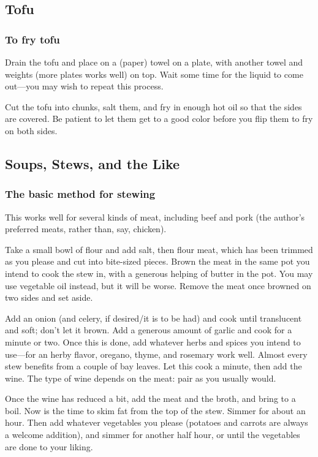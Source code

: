 \documentclass[10pt]{article}
\begin{document}
\subsection*{Tofu}

\subsubsection*{To fry tofu}

Drain the tofu and place on a (paper) towel on a plate, with another towel and weights (more plates works well) on top.
Wait some time for the liquid to come out---you may wish to repeat this process.

Cut the tofu into chunks, salt them, and fry in enough hot oil so that the sides are covered.
Be patient to let them get to a good color before you flip them to fry on both sides.

\subsection*{Soups, Stews, and the Like}

\subsubsection*{The basic method for stewing}

This works well for several kinds of meat, including beef and pork (the author's preferred meats, rather than, say, chicken).

Take a small bowl of flour and add salt, then flour meat, which has been trimmed as you please and cut into bite-sized pieces.
Brown the meat in the same pot you intend to cook the stew in, with a generous helping of butter in the pot.
You may use vegetable oil instead, but it will be worse.
Remove the meat once browned on two sides and set aside.

Add an onion (and celery, if desired/it is to be had) and cook until translucent and soft; don't let it brown.
Add a generous amount of garlic and cook for a minute or two.
Once this is done, add whatever herbs and spices you intend to use---for an herby flavor, oregano, thyme, and rosemary work well.
Almost every stew benefits from a couple of bay leaves.
Let this cook a minute, then add the wine.
The type of wine depends on the meat: pair as you usually would.

Once the wine has reduced a bit, add the meat and the broth, and bring to a boil.
Now is the time to skim fat from the top of the stew.
Simmer for about an hour.
Then add whatever vegetables you please (potatoes and carrots are always a welcome addition), and simmer for another half hour, or until the vegetables are done to your liking.
\end{document}
